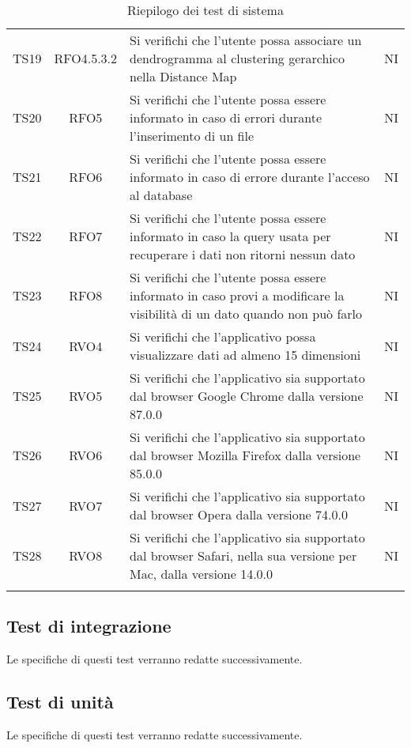 \documentclass[../piano_di_qualifica.tex]{subfiles}
\begin{document}
\begin{center}
\begin{longtable}{|c|c|p{8cm}|c|}
		TS19  & RFO4.5.3.2   	& Si verifichi che l'utente possa associare un dendrogramma al clustering gerarchico nella Distance Map & NI \\
		TS20  & RFO5     		& Si verifichi che l'utente possa essere informato in caso di errori durante l'inserimento di un file & NI \\
		TS21  & RFO6     		& Si verifichi che l'utente possa essere informato in caso di errore durante l'acceso al database & NI \\
		TS22  & RFO7     		& Si verifichi che l'utente possa essere informato in caso la query usata per recuperare i dati non ritorni nessun dato & NI \\
		TS23  & RFO8    		& Si verifichi che l'utente possa essere informato in caso provi a modificare la visibilità di un dato quando non può farlo & NI \\
		
		TS24  &  RVO4    		& Si verifichi che l'applicativo possa visualizzare dati ad almeno 15 dimensioni & NI \\
		TS25  & RVO5    		& Si verifichi che l'applicativo sia supportato dal browser Google Chrome dalla versione 87.0.0 & NI \\
		TS26  & RVO6        	& Si verifichi che l'applicativo sia supportato dal browser Mozilla Firefox dalla versione 85.0.0  & NI \\
		TS27  & RVO7        	& Si verifichi che l'applicativo sia supportato dal browser Opera dalla versione 74.0.0  & NI \\
		TS28  & RVO8      		& Si verifichi che l'applicativo sia supportato dal browser Safari, nella sua versione per Mac, dalla versione 14.0.0  & NI \\
		\hline
		\rowcolor{white}
		\caption{Riepilogo dei test di sistema}
	\end{longtable}

\end{center}

\subsection{Test di integrazione}%
\label{sub:test_int}
Le specifiche di questi test verranno redatte successivamente.

\subsection{Test di unità}%
\label{sub:test_unit}
Le specifiche di questi test verranno redatte successivamente.
\end{document}

